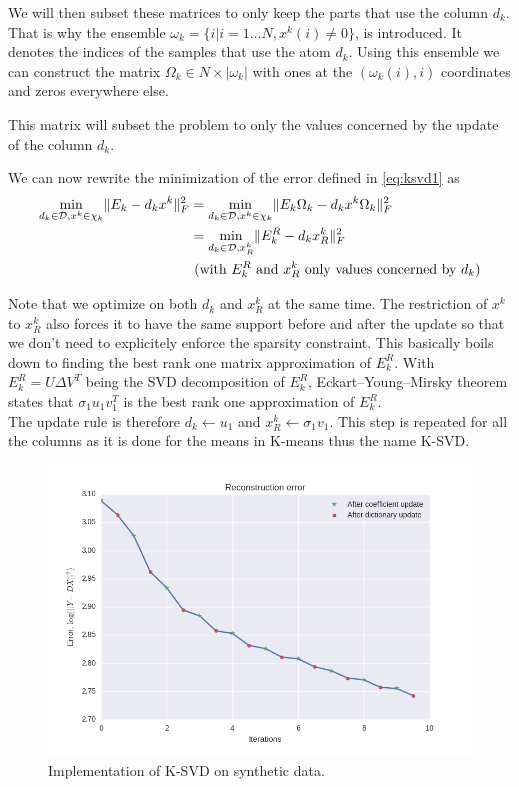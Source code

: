 \documentclass[a4paper,11pt]{article}
\DeclarePairedDelimiter\norm{\lVert}{\rVert} %
\begin{document}
We will then subset these matrices to only keep the parts that use the column $d_k$.
That is why the ensemble $\omega_k = \{i | i = 1 \ldots N, x^k(i) \neq 0\}$, is introduced. It denotes the indices of the samples that use the atom $d_k$.
Using this ensemble we can construct the matrix $\Omega_k \in N \times |\omega_k|$ with ones at the $(\omega_k(i),i)$ coordinates and zeros everywhere else.

This matrix will subset the problem to only the values concerned by the update of the column $d_k$.

We can now rewrite the minimization of the error defined in \ref{eq:ksvd1} as
\begin{equation*}
\begin{split}
  \min_{d_k \in \mathcal{D}, x^k \in \chi_k} \norm{E_k - d_k x^k }_F^2 & = \min_{d_k \in \mathcal{D}, x^k \in \chi_k} \norm{E_k \Omega_k - d_k x^k \Omega_k}_F^2 \\
  											& = \min_{d_k \in \mathcal{D}, x^k_R} \norm{E_k^R - d_k x^k_R}_F^2 \\
                                            & \text{ (with $E_k^R$ and $x^k_R$ only values concerned by $d_k$)}
\end{split}
\end{equation*}

Note that we optimize on both $d_k$ and $x^k_R$ at the same time. The restriction of $x^k$ to $x^k_R$ also forces it to have the same support before and after the update so that we don't need to explicitely enforce the sparsity constraint.
This basically boils down to finding the best rank one matrix approximation of $E_k^R$.
With $E_k^R = U \Delta V^T$ being the SVD decomposition of $E_k^R$, Eckart–Young–Mirsky theorem states that $\sigma_1 u_1 v_1^T$ is the best rank one approximation of $E_k^R$.\\
The update rule is therefore $d_k \leftarrow u_1$ and $x^k_R \leftarrow \sigma_1 v_1$.
This step is repeated for all the columns as it is done for the means in K-means thus the name K-SVD.

\begin{figure}[!htbp]
\centering
  \includegraphics[width=\linewidth]{ksvd_12_iter_synthetic.png}
  \caption{Implementation of K-SVD on synthetic data.}
\end{figure}
\end{document}
